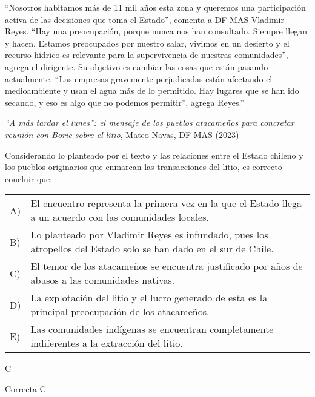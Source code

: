 \documentclass[letterpaper,11pt]{article}
\newcommand{\anchopregunta}{0.9\textwidth}
\begin{document}
\begin{enumerate}
\begin{minipage}{\anchopregunta}
\item ``Nosotros habitamos más de 11 mil años esta zona y queremos una participación activa de las decisiones que toma el Estado”, comenta a DF MAS Vladimir Reyes. “Hay una preocupación, porque nunca nos han consultado. Siempre llegan y hacen. Estamos preocupados por nuestro salar, vivimos en un desierto y el recurso hídrico es relevante para la supervivencia de nuestras comunidades”, agrega el dirigente.
Su objetivo es cambiar las cosas que están pasando actualmente. “Las empresas gravemente perjudicadas están afectando el medioambiente y usan el agua más de lo permitido. Hay lugares que se han ido secando, y eso es algo que no podemos permitir”, agrega Reyes.''
\begin{flushright}
\textit{“A más tardar el lunes”: el mensaje de los pueblos atacameños para concretar reunión con Boric sobre el litio}, Mateo Navas, DF MAS (2023)
\end{flushright}
Considerando lo planteado por el texto y las relaciones entre el Estado chileno y los pueblos originarios que enmarcan las transacciones del litio, es correcto concluir que:
\begin{flushleft}\begin{tabular}{@{\hspace{-.001\textwidth}}l@{\hspace{2pt}}p{}}
A)& El encuentro representa la primera vez en la que el Estado llega a un acuerdo con las comunidades locales.\\
B)& Lo planteado por Vladimir Reyes es infundado, pues los atropellos del Estado  solo se han dado en el sur de Chile.\\
C)& El temor de los atacameños se encuentra justificado por años de abusos a las comunidades nativas.\\
D)& La explotación del litio y el lucro generado de esta es la principal preocupación de los atacameños.\\
E)& Las comunidades indígenas se encuentran completamente indiferentes a la extracción del litio.\\ 
\end{tabular}\end{flushleft}%
\begin{key} C
\end{key} 
\begin{hint}
\end{hint}
\begin{answer} Correcta C \\

\end{answer}
\end{minipage}
\end{enumerate}
\end{document}
